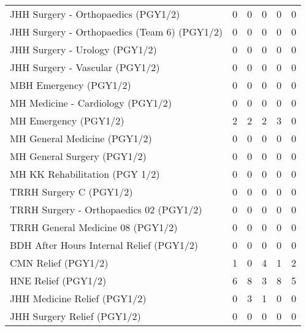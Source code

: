 \documentclass[
]{article}
\begin{document}
\begin{longtable}{lrrrrr}
JHH Surgery - Orthopaedics (PGY1/2) & 0 & 0 & 0 & 0 & 0 \\ 
JHH Surgery - Orthopaedics (Team 6) (PGY1/2) & 0 & 0 & 0 & 0 & 0 \\ 
JHH Surgery - Urology (PGY1/2) & 0 & 0 & 0 & 0 & 0 \\ 
JHH Surgery - Vascular (PGY1/2) & 0 & 0 & 0 & 0 & 0 \\ 
MBH Emergency (PGY1/2) & 0 & 0 & 0 & 0 & 0 \\ 
MH  Medicine - Cardiology (PGY1/2) & 0 & 0 & 0 & 0 & 0 \\ 
MH Emergency (PGY1/2) & 2 & 2 & 2 & 3 & 0 \\ 
MH General Medicine (PGY1/2) & 0 & 0 & 0 & 0 & 0 \\ 
MH General Surgery (PGY1/2) & 0 & 0 & 0 & 0 & 0 \\ 
MH KK Rehabilitation (PGY 1/2) & 0 & 0 & 0 & 0 & 0 \\ 
TRRH Surgery C (PGY1/2) & 0 & 0 & 0 & 0 & 0 \\ 
TRRH Surgery - Orthopaedics 02 (PGY1/2) & 0 & 0 & 0 & 0 & 0 \\ 
TRRH General Medicine 08 (PGY1/2) & 0 & 0 & 0 & 0 & 0 \\ 
BDH After Hours Internal Relief (PGY1/2) & 0 & 0 & 0 & 0 & 0 \\ 
CMN Relief (PGY1/2) & 1 & 0 & 4 & 1 & 2 \\ 
HNE Relief (PGY1/2) & 6 & 8 & 3 & 8 & 5 \\ 
JHH Medicine Relief (PGY1/2) & 0 & 3 & 1 & 0 & 0 \\ 
JHH Surgery Relief (PGY1/2) & 0 & 0 & 0 & 0 & 0 \\ 
\bottomrule
\end{longtable}
\end{document}
